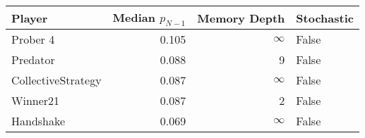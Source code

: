 \begin{tabular}{lrrl}
\toprule
             Player &  Median $p_{N-1}$ &  Memory Depth & Stochastic \\
\midrule
           Prober 4 &             0.105 &            \(\infty\) &      False \\
           Predator &             0.088 &             9 &      False \\
 CollectiveStrategy &             0.087 &            \(\infty\) &      False \\
           Winner21 &             0.087 &             2 &      False \\
          Handshake &             0.069 &            \(\infty\) &      False \\
\bottomrule
\end{tabular}
